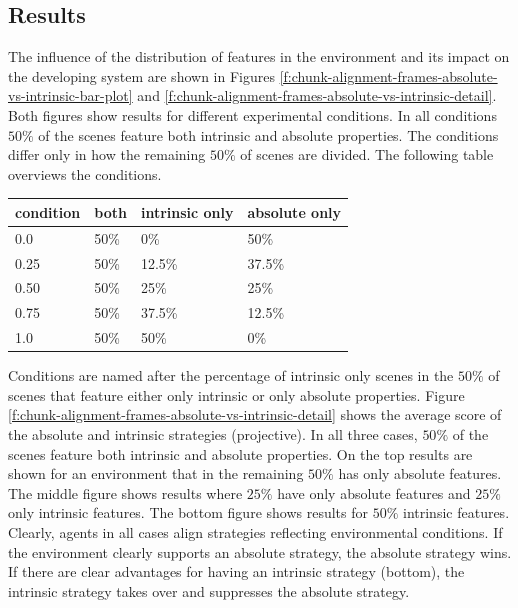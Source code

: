 \subsection{Results}
The influence of the distribution of features in the environment and its impact
on the developing system are shown in Figures 
\ref{f:chunk-alignment-frames-absolute-vs-intrinsic-bar-plot} 
and \ref{f:chunk-alignment-frames-absolute-vs-intrinsic-detail}. 
Both figures show results for different experimental conditions. In all conditions
$50\%$ of the scenes feature both intrinsic and absolute properties. The conditions
differ only in how the remaining $50\%$ of  scenes are divided. The following table
overviews the conditions.
\begin{center}
    \begin{tabular}{ | l | p{1.5cm} | p{1.5cm} | p{1.5cm} |}
    \hline
    condition & both & intrinsic only & absolute only \\ \hline\hline
    0.0 & 50\% & 0\% & 50\%\\ \hline
    0.25 & 50\% & 12.5\% & 37.5\% \\ \hline
    0.50 & 50\% & 25\% & 25\% \\ \hline
    0.75 & 50\% & 37.5\% & 12.5\% \\ \hline
    1.0 & 50\% & 50\% & 0\%\\ \hline
    \end{tabular}
    \label{t:conditions}
\end{center}
Conditions are named after the percentage of intrinsic only scenes in the $50\%$ of scenes that
feature either only intrinsic or only absolute properties. 
Figure \ref{f:chunk-alignment-frames-absolute-vs-intrinsic-detail} shows the average 
score of the absolute and intrinsic strategies (projective).  
In all three cases, $50\%$ of the scenes feature both intrinsic and absolute properties. 
On the top results are shown for an environment that in the remaining $50\%$ has only 
absolute features. The middle figure shows results where 
$25\%$ have only absolute features and $25\%$ only intrinsic features. 
The bottom figure shows results for $50\%$ intrinsic features. Clearly, agents in all 
cases align strategies reflecting environmental conditions. If the environment clearly 
supports an absolute strategy, the absolute strategy wins. If there are clear advantages 
for having an intrinsic strategy (bottom), the intrinsic strategy takes over and suppresses 
the absolute strategy.


